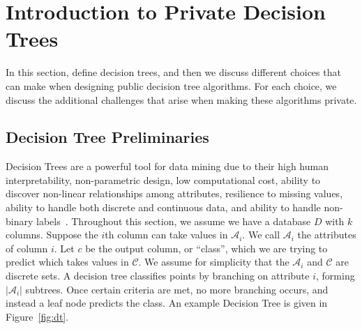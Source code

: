 \documentclass[11pt]{report}
\begin{document}
\section{Introduction to Private Decision Trees}\label{sec:pdtrees}
In this section, define decision trees, and then we discuss different choices that can make when designing public decision tree algorithms. For each choice, we discuss the additional challenges that arise when making these algorithms private.

\subsection{Decision Tree Preliminaries}
Decision Trees are a powerful tool for data mining due to their high human interpretability, non-parametric design, low computational cost, ability to discover non-linear relationships among attributes, resilience to missing values, ability to handle both discrete and continuous data, and ability to handle non-binary labels~\cite{Fletcher:2016}. Throughout this section, we assume we have a database $D$ with $k$ columns. Suppose the $i$th column can take values in $\mathcal{A}_i$. We call $\mathcal{A}_i$ the attributes of column $i$. Let $c$ be the output column, or ``class'', which we are trying to predict which takes values in $\mathcal{C}$. We assume for simplicity that the $\mathcal{A}_i$ and $\mathcal{C}$ are discrete sets. A decision tree classifies points by branching on attribute $i$, forming $|\mathcal{A}_i|$ subtrees. Once certain criteria are met, no more branching occurs, and instead a leaf node predicts the class. An example Decision Tree is given in Figure~\ref{fig:dt}.
\end{document}
